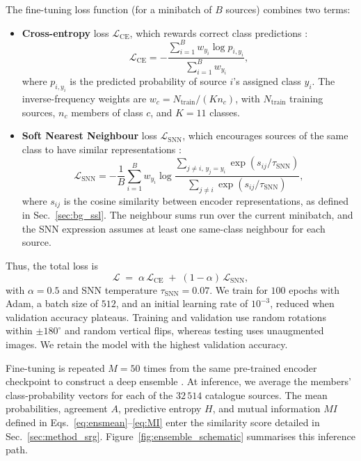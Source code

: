 The fine-tuning loss function (for a minibatch of \(B\) sources) combines two terms:
\begin{itemize}
\item \textbf{Cross-entropy} loss $\mathcal{L}_{\mathrm{CE}}$, which rewards correct class predictions \citep{Salakhutdinov2007}: 
\begin{equation}
\mathcal{L}_{\mathrm{CE}}
=-\frac{\sum_{i=1}^{B}w_{y_i}\log p_{i,y_i}}
{\sum_{i=1}^{B}w_{y_i}},
\label{eq:classifier_ce}
\end{equation} 
where \(p_{i,y_i}\) is the predicted probability of source \(i\)'s assigned class \(y_i\).
The inverse-frequency weights are \(w_c=N_{\mathrm{train}}/(K n_c)\), with \(N_{\mathrm{train}}\) training sources, \(n_c\) members of class \(c\), and \(K=11\) classes.
\item \textbf{Soft Nearest Neighbour} loss $\mathcal{L}_{\mathrm{SNN}}$, which encourages sources of the same class to have similar representations \citep{Frosst2019}:
\begin{equation}
\mathcal{L}_{\mathrm{SNN}}=-\frac{1}{B}\sum_{i=1}^{B}w_{y_i}\log
\frac{\sum_{j\ne i,\,y_j=y_i}\exp(s_{ij}/\tau_{\mathrm{SNN}})}
{\sum_{j\ne i}\exp(s_{ij}/\tau_{\mathrm{SNN}})},
\label{eq:classifier_snn}
\end{equation}
where \(s_{ij}\) is the cosine similarity between encoder representations, as defined in Sec.~\ref{sec:bg_ssl}. The neighbour sums run over the current minibatch, and the SNN expression assumes at least one same-class neighbour for each source.
\end{itemize}
Thus, the total loss is
\begin{equation}
\mathcal{L} \;=\; \alpha\,\mathcal{L}_{\mathrm{CE}} \;+\; (1-\alpha)\,\mathcal{L}_{\mathrm{SNN}},
\label{eq:ft_loss}
\end{equation}
with \(\alpha=0.5\) and SNN temperature \(\tau_{\mathrm{SNN}}=0.07\).
We train for \(100\) epochs with Adam, a batch size of \(512\), 
and an initial learning rate of \(10^{-3}\), reduced when validation accuracy plateaus.
Training and validation use random rotations within \(\pm180^{\circ}\) and random vertical flips, whereas testing uses unaugmented images. We retain the model with the highest validation accuracy.

Fine-tuning is repeated \(M=50\) times from the same pre-trained encoder checkpoint to construct a deep ensemble \citep{Lakshminarayanan2017}. At inference, we average the members' class-probability vectors for each of the \(32\,514\) catalogue sources. The mean probabilities, agreement \(A\), predictive entropy \(H\), and mutual information \(MI\) defined in Eqs.~\ref{eq:ensmean}--\ref{eq:MI} enter the similarity score detailed in Sec.~\ref{sec:method_srg}. Figure~\ref{fig:ensemble_schematic} summarises this inference path.

